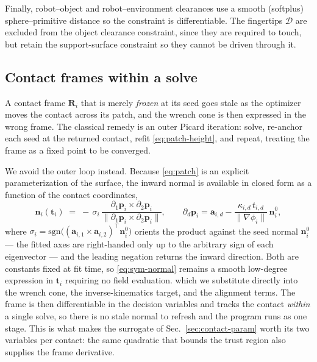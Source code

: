 Finally, robot--object and robot--environment clearances use a smooth (softplus)
sphere--primitive distance so the constraint is differentiable. The fingertips
$\mathcal{D}$ are excluded from the object clearance constraint, since they are
required to touch, but retain the support-surface constraint so they cannot be
driven through it.

\subsection{Contact frames within a solve}
\label{sec:picard}

A contact frame $\bm{R}_i$ that is merely \emph{frozen} at its seed goes stale as the
optimizer moves the contact across its patch, and the wrench cone is then expressed in
the wrong frame. The classical remedy is an outer Picard iteration: solve, re-anchor
each seed at the returned contact, refit \eqref{eq:patch-height}, and repeat, treating
the frame as a fixed point to be converged.

We avoid the outer loop instead. Because \eqref{eq:patch} is an explicit
parameterization of the surface, the inward normal is available in closed form as a
function of the contact coordinates,
%
\begin{equation}
  \bm{n}_i(\bm{t}_i) \;=\; -\,\sigma_i\,
    \frac{\partial_{1} \bm{p}_i \times \partial_{2} \bm{p}_i}
         {\lVert \partial_{1} \bm{p}_i \times \partial_{2} \bm{p}_i \rVert},
  \qquad
  \partial_{d} \bm{p}_i = \bm{a}_{i,d} - \frac{\kappa_{i,d}\, t_{i,d}}{\lVert \nabla \phi_i \rVert}\, \bm{n}_i^0 ,
  \label{eq:sym-normal}
\end{equation}
%
where $\sigma_i = \mathrm{sgn}\bigl((\bm{a}_{i,1} \times \bm{a}_{i,2})^{\top} \bm{n}_i^0\bigr)$
orients the product against the seed normal $\bm{n}_i^0$ --- the fitted axes are
right-handed only up to the arbitrary sign of each eigenvector --- and the leading
negation returns the inward direction. Both are constants fixed at fit time, so
\eqref{eq:sym-normal} remains a smooth low-degree expression in $\bm{t}_i$ requiring
no field evaluation.
%
which we substitute directly into the wrench cone, the inverse-kinematics target, and
the alignment terms. The frame is then differentiable in the decision variables and
tracks the contact \emph{within} a single solve, so there is no stale normal to
refresh and the program runs as one stage. This is what makes the surrogate of
Sec.~\ref{sec:contact-param} worth its two variables per contact: the same quadratic
that bounds the trust region also supplies the frame derivative.

